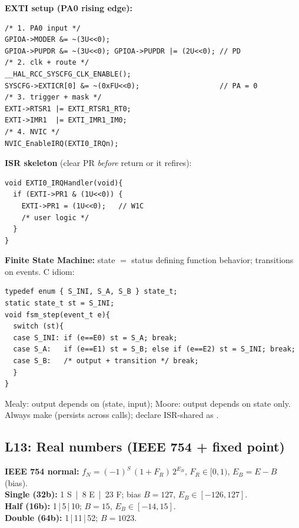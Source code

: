 \textbf{EXTI setup (PA0 rising edge):}
\begin{lstlisting}[language={}]
/* 1. PA0 input */
GPIOA->MODER &= ~(3U<<0);
GPIOA->PUPDR &= ~(3U<<0); GPIOA->PUPDR |= (2U<<0); // PD
/* 2. clk + route */
__HAL_RCC_SYSCFG_CLK_ENABLE();
SYSCFG->EXTICR[0] &= ~(0xFU<<0);                   // PA = 0
/* 3. trigger + mask */
EXTI->RTSR1 |= EXTI_RTSR1_RT0;
EXTI->IMR1  |= EXTI_IMR1_IM0;
/* 4. NVIC */
NVIC_EnableIRQ(EXTI0_IRQn);
\end{lstlisting}

\textbf{ISR skeleton} (clear PR \emph{before} return or it refires):
\begin{lstlisting}[language={}]
void EXTI0_IRQHandler(void){
  if (EXTI->PR1 & (1U<<0)) {
    EXTI->PR1 = (1U<<0);   // W1C
    /* user logic */
  }
}
\end{lstlisting}

\textbf{Finite State Machine:} state $=$ status defining function behavior; transitions on events. C idiom:
\begin{lstlisting}[language={}]
typedef enum { S_INI, S_A, S_B } state_t;
static state_t st = S_INI;
void fsm_step(event_t e){
  switch (st){
  case S_INI: if (e==E0) st = S_A; break;
  case S_A:   if (e==E1) st = S_B; else if (e==E2) st = S_INI; break;
  case S_B:   /* output + transition */ break;
  }
}
\end{lstlisting}
Mealy: output depends on (state, input); Moore: output depends on state only. Always make   (persists across calls); declare ISR-shared as .

\subsection{L13: Real numbers (IEEE 754 + fixed point)}
\textbf{IEEE 754 normal:} $f_N = (-1)^S\,(1+F_R)\,2^{E_B}$, $F_R\in[0,1)$, $E_B = E - B$ (bias).\\
\textbf{Single (32b):} 1 S \,|\, 8 E \,|\, 23 F; bias $B=127$, $E_B \in [-126,127]$.\\
\textbf{Half (16b):} 1\,|\,5\,|\,10; $B=15$, $E_B\in[-14,15]$.\\
\textbf{Double (64b):} 1\,|\,11\,|\,52; $B=1023$.

